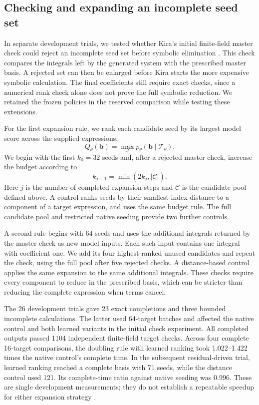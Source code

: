 \subsection{Checking and expanding an incomplete seed set}
In separate development trials, we tested whether Kira's initial
finite-field master check could reject an incomplete seed set before
symbolic elimination \cite{Kira3}. This check compares the integrals
left by the generated system with the prescribed master basis. A
rejected set can then be enlarged before Kira starts the more expensive
symbolic calculation. The final coefficients still require exact
checks, since a numerical rank check alone does not prove the full
symbolic reduction. We retained the frozen policies in the reserved
comparison while testing these extensions.

For the first expansion rule, we rank each candidate seed by its
largest model score across the supplied expressions,
\begin{equation}
 Q_\theta(\boldsymbol b)
 =\max_\nu p_\theta(\boldsymbol b\mid\mathcal T_\nu).
\end{equation}
We begin with the first $k_0=32$ seeds and, after a rejected master
check, increase the budget according to
\begin{equation}
 k_{j+1}=\min(2k_j,|\mathcal C|).
\end{equation}
Here $j$ is the number of completed expansion steps and $\mathcal C$
is the candidate pool defined above. A control ranks seeds by their
smallest index distance to a component of a target expression, and
uses the same budget rule. The full candidate pool and restricted
native seeding provide two further controls.

A second rule begins with 64 seeds and uses the additional integrals
returned by the master check as new model inputs. Each such input
contains one integral with coefficient one. We add its four
highest-ranked unused candidates and repeat the check, using the full
pool after five rejected checks. A distance-based control applies the
same expansion to the same additional integrals. These checks require
every component to reduce in the prescribed basis, which can be
stricter than reducing the complete expression when terms cancel.

The 26 development trials gave 23 exact completions and three bounded
incomplete calculations. The latter used 64-target batches and affected
the native control and both learned variants in the initial check
experiment. All completed outputs passed 1104 independent
finite-field target checks. Across four complete 16-target comparisons,
the doubling rule with learned ranking took 1.022--1.422 times the
native control's complete time. In the subsequent residual-driven
trial, learned ranking reached a complete basis with 71 seeds,
while the distance control used 121. Its complete-time ratio
against native seeding was 0.996. These are single development
measurements; they do not establish a repeatable speedup for either
expansion strategy \cite{KiraNativeAccelerationData}.
